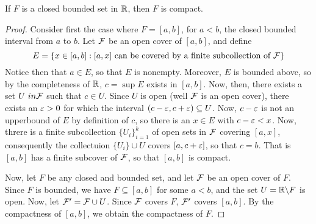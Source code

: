 \begin{theorem}\label{1.2.5}
    If $F$ is a closed bounded set in  $\mathbb{R}$, then  $F$ is compact.
\end{theorem}
\begin{proof}
    Consider first the case where $F=[a,b]$, for $a<b$, the closed bounded
    interval from  $a$ to  $b$. Let  $\mathcal{F}$ be an open cover of  $[a,b]$, and
    define
    \begin{equation*}
        E=\{x \in [a,b] : [a,x] \text{ can be covered by a finite subcollection
        of } \mathcal{F}\}
    \end{equation*}
    Notice then that $a \in E$, so that  $E$ is nonempty. Moreover,  $E$ is
    bounded above, so by the completeness of  $\mathbb{R}$,  $c=\sup{E}$ exists in
    $[a,b]$. Now, then, there exists a set $U\ in \mathcal{F}$ such that  $c \in U$.
    Since  $U$ is open (well $\mathcal{F}$ is an open cover), there exists an $\varepsilon>0$ for
    which the interval  $(c-\varepsilon,c+\varepsilon) \subseteq U$. Now, $c-\varepsilon$ is not an
    upperbound of $E$ by definition of $c$, so there is an $x \in E$ with
    $c-\varepsilon<x$. Now, threre is a finite subcollection  $\{U_i\}_{i=1}^k$ of open
    sets in $\mathcal{F}$ covering  $[a,x]$, consequently the collectuion $\{U_i\} \cup
    U$ covers $[a,c+\varepsilon]$, so that $c=b$. That is $[a,b]$ has a finite subcover
    of $\mathcal{F}$, so that  $[a,b]$ is compact.

    Now, let $F$ be any closed and bounded set, and let  $\mathcal{F}$ be an open cover
    of  $F$. Since  $F$ is bounded, we have $F \subseteq [a,b]$ for some $a<b$,
    and the set $U=\mathbb{R} \backslash F$ is open. Now, let $\mathcal{F}'=\mathcal{F} \cup U$. Since
    $\mathcal{F}$ covers $F$,  $\mathcal{F}'$ covers  $[a,b]$. By the compactness of $[a,b]$, we
    obtain the compactness of $F$.
\end{proof}

